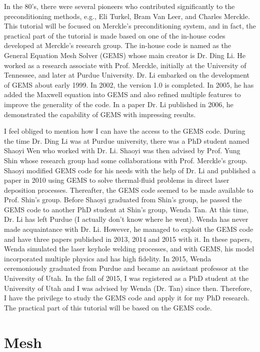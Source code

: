 \documentclass[11pt, letterpaper]{report}
\begin{document}
In the 80's, there were several pioneers who contributed significantly to the preconditioning
methods, e.g., Eli Turkel, Bram Van Leer, and Charles Merckle. This tutorial will be focused on
Merckle's preconditioning system, and in fact, the practical part of the tutorial is made based on
one of the in-house codes developed at Merckle's research group. The in-house code is named as the
General Equation Mesh Solver (GEMS) whose main creator is Dr. Ding Li. He worked as a research
associate with Prof. Merckle, initially at the University of Tennessee, and later at Purdue
University. Dr. Li embarked on the development of GEMS about early 1999. In 2002, the version 1.0 is
completed. In 2005, he has added the Maxwell equation into GEMS and also refined multiple features
to improve the generality of the code. In a paper Dr. Li published in 2006, he demonstrated the
capability of GEMS with impressing results.
\paraspace

I feel obliged to mention how I can have the access to the GEMS code. During the time Dr. Ding Li
was at Purdue university, there was a PhD student named Shaoyi Wen who worked with Dr. Li. Shaoyi
was then advised by Prof. Yung Shin whose research group had some collaborations with Prof.
Merckle's group. Shaoyi modified GEMS code for his needs with the help of Dr. Li and published a
paper in 2010 using GEMS to solve thermal-fluid problems in direct laser deposition processes.
Thereafter, the GEMS code seemed to be made available to Prof. Shin's group. Before Shaoyi graduated
from Shin's group, he passed the GEMS code to another PhD student at Shin's group, Wenda Tan. At
this time, Dr. Li has left Purdue (I actually don't know where he went). Wenda has never made
acquaintance with Dr. Li. However, he managed to exploit the GEMS code and have three papers
published in 2013, 2014 and 2015 with it. In these papers, Wenda simulated the laser keyhole welding
processes, and with GEMS, his model incorporated multiple physics and has high fidelity. In 2015,
Wenda ceremoniously graduated from Purdue and became an assistant professor at the University of
Utah. In the fall of 2015, I was registered as a PhD student at the University of Utah and I was
advised by Wenda (Dr. Tan) since then. Therefore, I have the privilege to study the GEMS code and
apply it for my PhD research. The practical part of this tutorial will be based on the GEMS code.


\chapter{Mesh}
\setlength{\abovedisplayskip}{3pt}
\setlength{\belowdisplayskip}{3pt}











\clearpage


\end{document}
